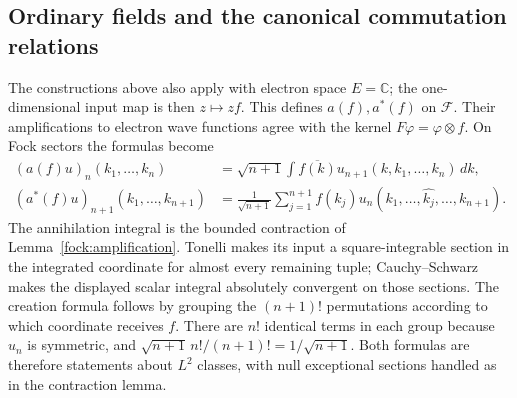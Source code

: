 \documentclass[11pt,a4paper]{article}
\theoremstyle{definition}
\theoremstyle{remark}
\begin{document}
\subsection{Ordinary fields and the canonical commutation relations}

The constructions above also apply with electron space $E=\mathbb C$;
the one-dimensional input map is then $z\mapsto zf$. This defines
$a(f),a^*(f)$ on $\mathcal F$. Their amplifications to electron
wave functions agree with the kernel $F\varphi=\varphi\otimes f$.
On Fock sectors the formulas become
\begin{align*}
 (a(f)u)_n(k_1,\ldots,k_n)
  &=\sqrt{n+1}\int\overline{f(k)}u_{n+1}(k,k_1,\ldots,k_n)\,dk,\\
 (a^*(f)u)_{n+1}(k_1,\ldots,k_{n+1})
  &=\frac1{\sqrt{n+1}}\sum_{j=1}^{n+1}f(k_j)
                    u_n(k_1,\ldots,\widehat{k_j},\ldots,k_{n+1}).
\end{align*}
The annihilation integral is the bounded contraction of
Lemma~\ref{fock:amplification}. Tonelli makes its input a square-integrable
section in the integrated coordinate for almost every remaining tuple;
Cauchy--Schwarz makes the displayed scalar integral absolutely convergent
on those sections. The creation formula follows by grouping the
$(n+1)!$ permutations according to which coordinate receives $f$.
There are $n!$ identical terms in each group because $u_n$ is symmetric,
and $\sqrt{n+1}\,n!/(n+1)!=1/\sqrt{n+1}$. Both formulas are
therefore statements about $L^2$ classes, with null exceptional sections
handled as in the contraction lemma.
\end{document}
